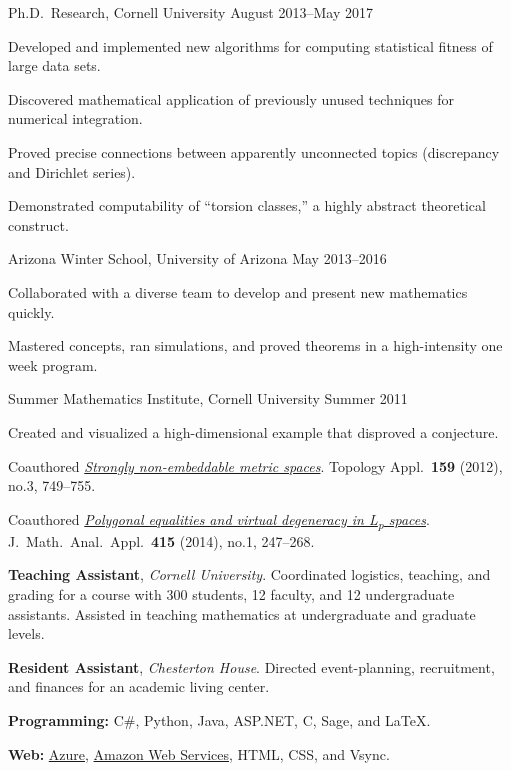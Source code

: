 \documentclass[11pt, letterpaper]{awesome-cv}
\begin{document}

\begin{cventries}

\cventry
	{Ph.D.~Research, Cornell University}
	{}{}
	{August 2013--May 2017}
	{
		\begin{cvitems}
			\item{Developed and implemented new algorithms for computing statistical fitness of large data sets.}
			\item{Discovered mathematical application of previously unused techniques for numerical integration.}
			\item{Proved precise connections between apparently unconnected topics (discrepancy and Dirichlet series).}
			\item{Demonstrated computability of ``torsion classes,'' a highly abstract theoretical construct.}
		\end{cvitems}
	}
		
\cventry
	{Arizona Winter School, University of Arizona}
	{}{}
	{May 2013--2016}
	{
		\begin{cvitems}
			\item{Collaborated with a diverse team to develop and present new mathematics quickly.}
			\item{Mastered concepts, ran simulations, and proved theorems in a high-intensity one week program.}
		\end{cvitems}
	}
	
\cventry
	{Summer Mathematics Institute, Cornell University}
	{}{}
	{Summer 2011}
	{
		\begin{cvitems}
			\item{Created and visualized a high-dimensional example that disproved a conjecture.}
			\item{Coauthored \href{http://dx.doi.org/10.1016/j.topol.2011.11.041}{\emph{Strongly non-embeddable metric spaces}}. Topology Appl.~\textbf{159} (2012), no.3, 749--755.}
			\item{Coauthored \href{http://dx.doi.org/10.1016/j.jmaa.2014.01.063}{\emph{Polygonal equalities and virtual degeneracy in L\textsubscript{p} spaces}}. J.~Math.~Anal.~Appl.~\textbf{415} (2014), no.1, 247--268.}
		\end{cvitems}
	}
\end{cventries}






\begin{cvparagraph}
\textbf{Teaching Assistant}, \emph{Cornell University}. Coordinated logistics, teaching, and grading for a course with 300 students, 12 faculty, and 12 undergraduate assistants.
Assisted in teaching mathematics at undergraduate and graduate levels.

\textbf{Resident Assistant}, \emph{Chesterton House}. Directed event-planning, recruitment, and finances for an academic living center. 
\end{cvparagraph}






\begin{cvparagraph}
\textbf{Programming:} C\#, Python, Java, ASP.NET, C, Sage, and \LaTeX.

\textbf{Web:} \href{https://azure.microsoft.com/}{Azure}, \href{https://aws.amazon.com/}{Amazon Web Services}, HTML, CSS, and Vsync.
\end{cvparagraph}
\end{document}
